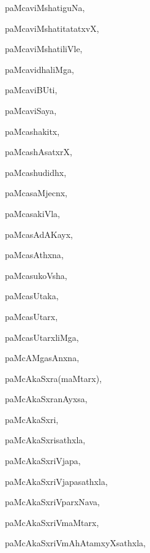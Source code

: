 \begin{multicols}{3}
{\noindent
{paMcaviMshatiguNa}, \pageref{paMcaviMshatiguNa}

\noindent
{paMcaviMshatitatatxvX}, \pageref{paMcaviMshatitatatxvX}

\noindent
{paMcaviMshatiliVle}, \pageref{paMcaviMshatiliVle}

\noindent
{paMcavidhaliMga}, \pageref{paMcavidhaliMga}

\noindent
{paMcaviBUti}, \pageref{paMcaviBUti}

\noindent
{paMcaviSaya}, \pageref{paMcaviSaya}

\noindent
{paMcashakitx}, \pageref{paMcashakitx}

\noindent
{paMcashAsatxrX}, \pageref{paMcashAsatxrX}

\noindent
{paMcashudidhx}, \pageref{paMcashudidhx}

\noindent
{paMcasaMjecnx}, \pageref{paMcasaMjecnx}

\noindent
{paMcasakiVla}, \pageref{paMcasakiVla}

\noindent
{paMcasAdAKayx}, \pageref{paMcasAdAKayx}

\noindent
{paMcasAthxna}, \pageref{paMcasAthxna}

\noindent
{paMcasukoVsha}, \pageref{paMcasukoVsha}

\noindent
{paMcasUtaka}, \pageref{paMcasUtaka}

\noindent
{paMcasUtarx}, \pageref{paMcasUtarx}

\noindent
{paMcasUtarxliMga}, \pageref{paMcasUtarxliMga}

\noindent
{paMcAMgasAnxna}, \pageref{paMcAMgasAnxna}

\noindent
{paMcAkaSxra(maMtarx)}, \pageref{paMcAkaSxramaMtarx}

\noindent
{paMcAkaSxranAyxsa}, \pageref{paMcAkaSxranAyxsa}

\noindent
{paMcAkaSxri}, \pageref{paMcAkaSxri}

\noindent
{paMcAkaSxrisathxla}, \pageref{paMcAkaSxrisathxla}

\noindent
{paMcAkaSxriVjapa}, \pageref{paMcAkaSxriVjapa}

\noindent
{paMcAkaSxriVjapasathxla}, \pageref{paMcAkaSxriVjapasathxla}

\noindent
{paMcAkaSxriVparxNava}, \pageref{paMcAkaSxriVparxNava}

\noindent
{paMcAkaSxriVmaMtarx}, \pageref{paMcAkaSxriVmaMtarx}

\noindent
{paMcAkaSxriVmAhAtamxyXsathxla}, \pageref{paMcAkaSxriVmAhAtamxyXsathxla}

}
\end{multicols}
